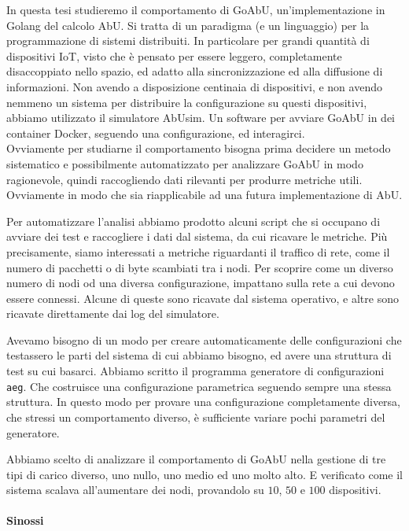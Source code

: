 \documentclass[target=bach]{thud}
\newcommand{\aeg}[0]{{\lstinline{aeg}}\xspace}
\begin{document}
In questa tesi studieremo il comportamento di GoAbU, un'implementazione in Golang del calcolo AbU. Si tratta di un paradigma (e un linguaggio) per la programmazione di sistemi distribuiti.
In particolare per grandi quantità di dispositivi IoT, visto che è pensato per essere leggero, completamente disaccoppiato nello spazio, ed adatto alla sincronizzazione ed alla diffusione di informazioni.
Non avendo a disposizione centinaia di dispositivi, e non avendo nemmeno un sistema per distribuire la configurazione su questi dispositivi, abbiamo utilizzato il simulatore AbUsim. Un software per avviare GoAbU in dei container Docker, seguendo una configurazione, ed interagirci.\\
Ovviamente per studiarne il comportamento bisogna prima decidere un metodo sistematico e possibilmente automatizzato per analizzare GoAbU in modo ragionevole, quindi raccogliendo dati rilevanti per produrre metriche utili. Ovviamente in modo che sia riapplicabile ad una futura implementazione di AbU.

Per automatizzare l'analisi abbiamo prodotto alcuni script che si occupano di avviare dei test e raccogliere i dati dal sistema, da cui ricavare le metriche.
Più precisamente, siamo interessati a metriche riguardanti il traffico di rete, come il numero di pacchetti o di byte scambiati tra i nodi.
Per scoprire come un diverso numero di nodi od una diversa configurazione, impattano sulla rete a cui devono essere connessi. Alcune di queste sono ricavate dal sistema operativo, e altre sono ricavate direttamente dai log del simulatore.

Avevamo bisogno di un modo per creare automaticamente delle configurazioni che testassero le parti del sistema di cui abbiamo bisogno, ed avere una struttura di test su cui basarci. Abbiamo scritto il programma generatore di configurazioni \aeg. Che costruisce una configurazione parametrica seguendo sempre una stessa struttura.
In questo modo per provare una configurazione completamente diversa, che stressi un comportamento diverso, è sufficiente variare pochi parametri del generatore.

Abbiamo scelto di analizzare il comportamento di GoAbU nella gestione di tre tipi di carico diverso, uno nullo, uno medio ed uno molto alto. E verificato come il sistema scalava all'aumentare dei nodi, provandolo su $10$, $50$ e $100$ dispositivi.

\paragraph{Sinossi}
\end{document}
